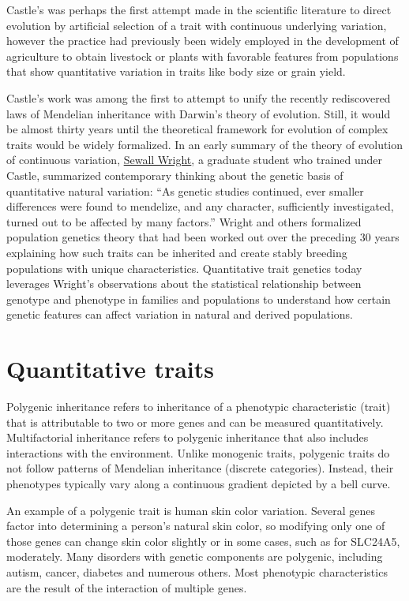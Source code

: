 Castle's was perhaps the first attempt made in the scientific literature to direct evolution by artificial selection of a trait with continuous underlying variation, however the practice had previously been widely employed in the development of agriculture to obtain livestock or plants with favorable features from populations that show quantitative variation in traits like body size or grain yield.

Castle's work was among the first to attempt to unify the recently rediscovered laws of Mendelian inheritance with Darwin's theory of evolution. Still, it would be almost thirty years until the theoretical framework for evolution of complex traits would be widely formalized. In an early summary of the theory of evolution of continuous variation, \href{https://en.wikipedia.org/wiki/Sewall_Wright}{Sewall Wright}, a graduate student who trained under Castle, summarized contemporary thinking about the genetic basis of quantitative natural variation: ``As genetic studies continued, ever smaller differences were found to mendelize, and any character, sufficiently investigated, turned out to be affected by many factors.'' Wright and others formalized population genetics theory that had been worked out over the preceding 30 years explaining how such traits can be inherited and create stably breeding populations with unique characteristics. Quantitative trait genetics today leverages Wright's observations about the statistical relationship between genotype and phenotype in families and populations to understand how certain genetic features can affect variation in natural and derived populations.

\hypertarget{quantitative-traits}{%
\section{Quantitative traits}\label{quantitative-traits}}

Polygenic inheritance refers to inheritance of a phenotypic characteristic (trait) that is attributable to two or more genes and can be measured quantitatively. Multifactorial inheritance refers to polygenic inheritance that also includes interactions with the environment. Unlike monogenic traits, polygenic traits do not follow patterns of Mendelian inheritance (discrete categories). Instead, their phenotypes typically vary along a continuous gradient depicted by a bell curve.

An example of a polygenic trait is human skin color variation. Several genes factor into determining a person's natural skin color, so modifying only one of those genes can change skin color slightly or in some cases, such as for SLC24A5, moderately. Many disorders with genetic components are polygenic, including autism, cancer, diabetes and numerous others. Most phenotypic characteristics are the result of the interaction of multiple genes.

